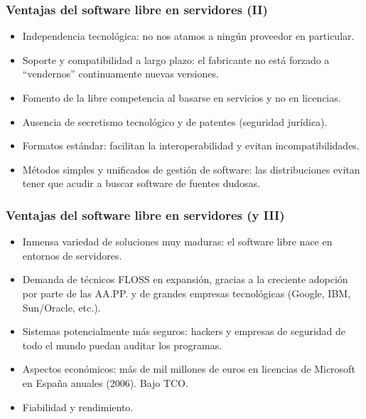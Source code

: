 \documentclass{beamer}
\begin{document}
\begin{frame}
\frametitle{Ventajas del software libre en servidores (II)}

\begin{itemize}
\item \alert{Independencia tecnológica}: no nos atamos a ningún proveedor en particular.
\item Soporte y \alert{compatibilidad} a largo plazo: el fabricante no está forzado a ``vendernos'' continuamente nuevas versiones. 
\item Fomento de la \alert{libre competencia} al basarse en servicios y no en licencias.
\item Ausencia de secretismo tecnológico y de patentes (seguridad jurídica). 
\item \alert{Formatos estándar}: facilitan la interoperabilidad y evitan incompatibilidades. 
\item Métodos simples y unificados de gestión de software: las distribuciones evitan tener que acudir a buscar software de fuentes dudosas.
\end{itemize}
\end{frame}


\begin{frame}
\frametitle{Ventajas del software libre en servidores (y III)}

\begin{itemize}
\item Inmensa \alert{variedad} de soluciones muy \alert{maduras}: el software libre nace en entornos de servidores.
\item Demanda de técnicos FLOSS en expansión, gracias a la creciente adopción por parte de las AA.PP. y de grandes empresas tecnológicas (Google, IBM, Sun/Oracle, etc.).
\item Sistemas \alert{potencialmente más seguros}: hackers y empresas de seguridad de todo el mundo puedan auditar los programas.
\item Aspectos económicos: más de mil millones de euros en licencias de Microsoft en España anuales (2006). Bajo TCO.
\item Fiabilidad y rendimiento.
\end{itemize}
\end{frame}

\end{document}
